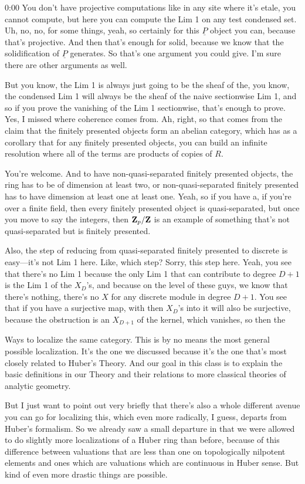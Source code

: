 \begin{unfinished}{0:00}
You don't have projective computations like in any site where it's etale, you cannot compute, but here you can compute the Lim 1 on any test condensed set. Uh, no, no, for some things, yeah, so certainly for this $\underline{P}$ object you can, because that's projective. And then that's enough for solid, because we know that the solidification of $\underline{P}$ generates. So that's one argument you could give. I'm sure there are other arguments as well.

But you know, the Lim 1 is always just going to be the sheaf of the, you know, the condensed Lim 1 will always be the sheaf of the naive sectionwise Lim 1, and so if you prove the vanishing of the Lim 1 sectionwise, that's enough to prove. Yes, I missed where coherence comes from. Ah, right, so that comes from the claim that the finitely presented objects form an abelian category, which has as a corollary that for any finitely presented objects, you can build an infinite resolution where all of the terms are products of copies of $R$.

You're welcome. And to have non-quasi-separated finitely presented objects, the ring has to be of dimension at least two, or non-quasi-separated finitely presented has to have dimension at least one at least one. Yeah, so if you have a, if you're over a finite field, then every finitely presented object is quasi-separated, but once you move to say the integers, then $\mathbf Z_p/\mathbf Z$ is an example of something that's not quasi-separated but is finitely presented.

Also, the step of reducing from quasi-separated finitely presented to discrete is easy---it's not Lim 1 here. Like, which step? Sorry, this step here. Yeah, you see that there's no Lim 1 because the only Lim 1 that can contribute to degree $D+1$ is the Lim 1 of the $X_D$'s, and because on the level of these guys, we know that there's nothing, there's no $X$ for any discrete module in degree $D+1$. You see that if you have a surjective map, with then $X_D$'s into it will also be surjective, because the obstruction is an $X_{D+1}$ of the kernel, which vanishes, so then the

Ways to localize the same category. This is by no means the most general possible localization. It's the one we discussed because it's the one that's most closely related to Huber's Theory. And our goal in this class is to explain the basic definitions in our Theory and their relations to more classical theories of analytic geometry.

But I just want to point out very briefly that there's also a whole different avenue you can go for localizing this, which even more radically, I guess, departs from Huber's formalism. So we already saw a small departure in that we were allowed to do slightly more localizations of a Huber ring than before, because of this difference between valuations that are less than one on topologically nilpotent elements and ones which are valuations which are continuous in Huber sense. But kind of even more drastic things are possible.


\end{unfinished}
